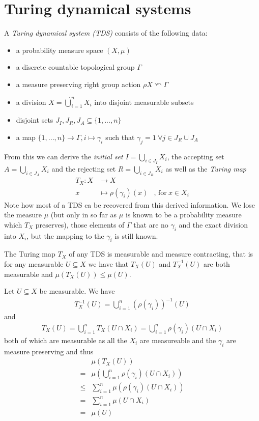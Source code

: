 \section{Turing dynamical systems} \label{tds}

\begin{Definition}
	A \emph{Turing dynamical system (TDS) } consists of the following data:
	\begin{itemize}
		\item{a probability measure space $(X,\mu)$}
		\item{a discrete countable topological group $\Gamma$}
		\item{a measure preserving right group action $\rho X \curvearrowleft \Gamma$}
		\item{a division $X = \dot\bigcup_{i=1}^n X_i$ into disjoint measurable subsets}
		\item{disjoint sets $J_I, J_R, J_A \subseteq \{1,...,n\}$}
		\item{a map $\{1,...,n\} \to \Gamma, i \mapsto \gamma_i$ such that $\gamma_j = 1~\forall j \in J_R \cup J_A$}
	\end{itemize}
\end{Definition}
From this we can derive the \emph{initial set} $I = \bigcup_{i\in J_I} X_i$, the accepting set $A = \bigcup_{i \in J_A} X_i$ and the rejecting set $R = \bigcup_{i \in J_R} X_i$ as well as the \emph{Turing map}
\begin{align*}
	T_X : X &\to X \\
	x &\mapsto \rho(\gamma_i)(x)&\text{, for}~x \in X_i
\end{align*}
Note how most of a TDS ca be recovered from this derived information.
We lose the measure $\mu$ (but only in so far as $\mu$ is known to be a probability measure which $T_X$ preserves),
those elements of $\Gamma$ that are no $\gamma_i$
and the exact division into $X_i$, but the mapping to the $\gamma_i$ is still known.

\begin{Lemma}
	The Turing map $T_X$ of any TDS is measurable and measure contracting, that is for any measurable $U \subseteq X$ we have that $T_X(U)$ and $T_X^{-1}(U)$ are both measurable and $\mu(T_X(U)) \leq \mu(U)$.
\end{Lemma}
\proof
Let $U \subseteq X$ be measurable. We have
\begin{align*}
	T_X^{-1}(U) = \bigcup_{i=1}^n (\rho(\gamma_i))^{-1}(U)
\end{align*}
and
\begin{align*}
	T_X(U) = \bigcup_{i=1}^n T_X(U \cap X_i) = \bigcup_{i=1}^n \rho(\gamma_i)(U \cap X_i)
\end{align*}
both of which are measurable as all the $X_i$ are measureable and the $\gamma_i$ are measure preserving and thus
\begin{align*}
	&\mu(T_X(U)) \\
	= &\mu(\bigcup_{i=1}^n \rho(\gamma_i)(U \cap X_i)) \\
	\leq &\sum_{i=1}^n \mu(\rho(\gamma_i)(U \cap X_i)) \\
	= &\sum_{i=1}^n \mu(U \cap X_i) \\
	= &\mu(U)
\end{align*}
\endproof

